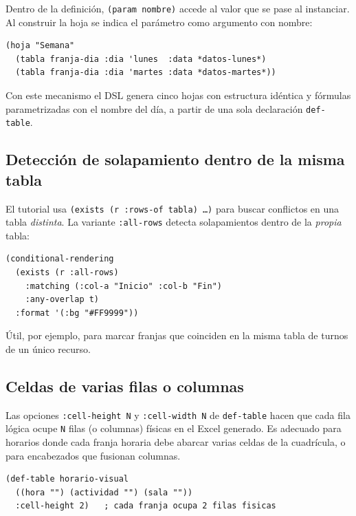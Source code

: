 \documentclass[12pt,a4paper]{report}
\begin{document}
Dentro de la definición, \texttt{(param nombre)} accede al valor que se
pase al instanciar.  Al construir la hoja se indica el parámetro como
argumento con nombre:

\begin{lstlisting}
(hoja "Semana"
  (tabla franja-dia :dia 'lunes  :data *datos-lunes*)
  (tabla franja-dia :dia 'martes :data *datos-martes*))
\end{lstlisting}

Con este mecanismo el DSL genera cinco hojas con estructura idéntica y
fórmulas parametrizadas con el nombre del día, a partir de una sola
declaración \texttt{def-table}.

\subsection*{Detección de solapamiento dentro de la misma tabla}

El tutorial usa \texttt{(exists (r :rows-of tabla) \ldots)} para buscar
conflictos en una tabla \emph{distinta}.  La variante \texttt{:all-rows}
detecta solapamientos dentro de la \emph{propia} tabla:

\begin{lstlisting}
(conditional-rendering
  (exists (r :all-rows)
    :matching (:col-a "Inicio" :col-b "Fin")
    :any-overlap t)
  :format '(:bg "#FF9999"))
\end{lstlisting}

Útil, por ejemplo, para marcar franjas que coinciden en la misma tabla de
turnos de un único recurso.

\subsection*{Celdas de varias filas o columnas}

Las opciones \texttt{:cell-height~N} y \texttt{:cell-width~N} de
\texttt{def-table} hacen que cada fila lógica ocupe \texttt{N} filas
(o columnas) físicas en el Excel generado.  Es adecuado para horarios
donde cada franja horaria debe abarcar varias celdas de la cuadrícula,
o para encabezados que fusionan columnas.

\begin{lstlisting}
(def-table horario-visual
  ((hora "") (actividad "") (sala ""))
  :cell-height 2)   ; cada franja ocupa 2 filas fisicas
\end{lstlisting}
\end{document}

